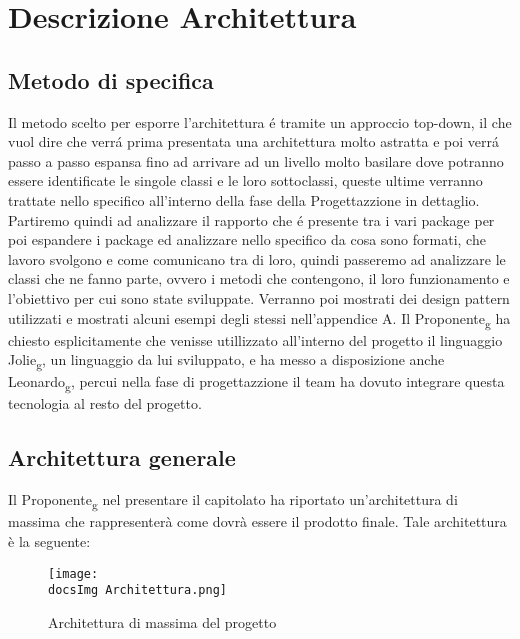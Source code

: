 \section{Descrizione Architettura}{
	
	\subsection{Metodo di specifica}{
	
	    Il metodo scelto per esporre l'architettura é tramite un approccio top-down, il che vuol dire che verrá prima presentata una architettura molto astratta e poi verrá passo a passo espansa fino ad arrivare 
	    ad un livello molto basilare dove potranno essere identificate le singole classi e le loro sottoclassi, queste ultime verranno trattate nello specifico all'interno della fase della Progettazzione in dettaglio. 
	    Partiremo quindi ad analizzare il rapporto che é presente tra i vari package per poi espandere i package ed analizzare nello specifico da cosa sono formati, che lavoro svolgono e come comunicano tra di loro,
	    quindi passeremo ad analizzare le classi che ne fanno parte, ovvero i metodi che contengono, il loro funzionamento e l'obiettivo per cui sono state sviluppate. Verranno poi mostrati dei design pattern utilizzati
	    e mostrati alcuni esempi degli stessi nell'appendice A.	Il Proponente\textsubscript{g} ha chiesto esplicitamente che venisse utillizzato all'interno del progetto il linguaggio Jolie\textsubscript{g}, un linguaggio da lui sviluppato,
	    e ha messo a disposizione anche Leonardo\textsubscript{g}, percui nella fase di progettazzione il team ha dovuto integrare questa tecnologia al resto del progetto.
		
	}
	\subsection{Architettura generale}{
		Il Proponente\textsubscript{g} nel presentare il capitolato ha riportato un'architettura di massima che rappresenterà come dovrà essere il prodotto finale. Tale architettura è la seguente:
	
		\begin{figure}[H]
			\centering
			\texttt{[image: \\docsImg Architettura.png]}
			\caption{Architettura di massima del progetto}
			\label{Architettura di massima del progetto}
		\end{figure}
		
}}

